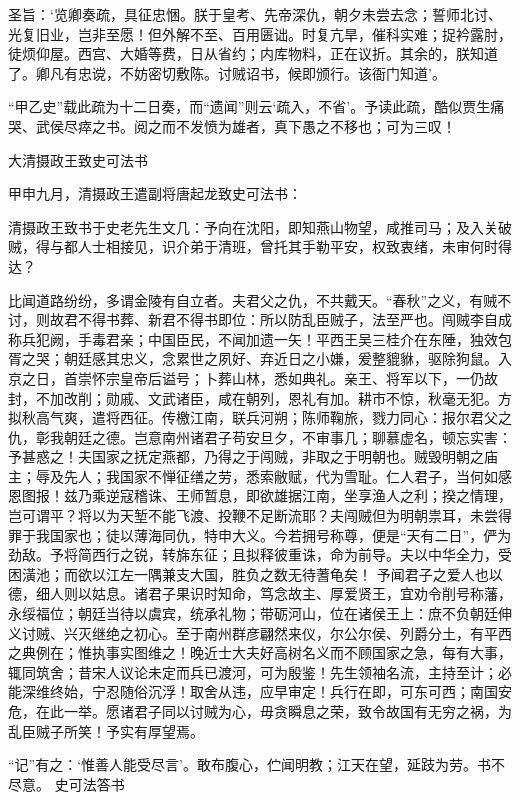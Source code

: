 \documentclass[]{article}
\begin{document}
圣旨：`览卿奏疏，具征忠悃。朕于皇考、先帝深仇，朝夕未尝去念；誓师北讨、光复旧业，岂非至愿！但外解不至、百用匮诎。时复亢旱，催科实难；捉衿露肘，徒烦仰屋。西宫、大婚等费，日从省约；内库物料，正在议折。其余的，朕知道了。卿凡有忠谠，不妨密切敷陈。讨贼诏书，候即颁行。该衙门知道'。

``甲乙史''载此疏为十二日奏，而``遗闻''则云`疏入，不省'。予读此疏，酷似贾生痛哭、武侯尽瘁之书。阅之而不发愤为雄者，真下愚之不移也；可为三叹！

大清摄政王致史可法书

甲申九月，清摄政王遣副将唐起龙致史可法书：

清摄政王致书于史老先生文几：予向在沈阳，即知燕山物望，咸推司马；及入关破贼，得与都人士相接见，识介弟于清班，曾托其手勒平安，权致衷绪，未审何时得达？

比闻道路纷纷，多谓金陵有自立者。夫君父之仇，不共戴天。``春秋''之义，有贼不讨，则故君不得书葬、新君不得书即位：所以防乱臣贼子，法至严也。闯贼李自成称兵犯阙，手毒君亲；中国臣民，不闻加遗一矢！平西王吴三桂介在东陲，独效包胥之哭；朝廷感其忠义，念累世之夙好、弃近日之小嫌，爰整貔貅，驱除狗鼠。入京之日，首崇怀宗皇帝后谥号；卜葬山林，悉如典礼。亲王、将军以下，一仍故封，不加改削；勋戚、文武诸臣，咸在朝列，恩礼有加。耕市不惊，秋毫无犯。方拟秋高气爽，遣将西征。传檄江南，联兵河朔；陈师鞠旅，戮力同心：报尔君父之仇，彰我朝廷之德。岂意南州诸君子苟安旦夕，不审事几；聊慕虚名，顿忘实害：予甚惑之！夫国家之抚定燕都，乃得之于闯贼，非取之于明朝也。贼毁明朝之庙主；辱及先人；我国家不惮征缮之劳，悉索敝赋，代为雪耻。仁人君子，当何如感恩图报！兹乃乘逆寇稽诛、王师暂息，即欲雄据江南，坐享渔人之利；揆之情理，岂可谓平？将以为天堑不能飞渡、投鞭不足断流耶？夫闯贼但为明朝祟耳，未尝得罪于我国家也；徒以薄海同仇，特申大义。今若拥号称尊，便是``天有二日''，俨为劲敌。予将简西行之锐，转旆东征；且拟释彼重诛，命为前导。夫以中华全力，受困潢池；而欲以江左一隅兼支大国，胜负之数无待蓍龟矣！
予闻君子之爱人也以德，细人则以姑息。诸君子果识时知命，笃念故主、厚爱贤王，宜劝令削号称藩，永绥福位；朝廷当待以虞宾，统承礼物；带砺河山，位在诸侯王上：庶不负朝廷伸义讨贼、兴灭继绝之初心。至于南州群彦翩然来仪，尔公尔侯、列爵分土，有平西之典例在；惟执事实图维之！晚近士大夫好高树名义而不顾国家之急，每有大事，辄同筑舍；昔宋人议论未定而兵已渡河，可为殷鉴！先生领袖名流，主持至计；必能深维终始，宁忍随俗沉浮！取舍从违，应早审定！兵行在即，可东可西；南国安危，在此一举。愿诸君子同以讨贼为心，毋贪瞬息之荣，致令故国有无穷之祸，为乱臣贼子所笑！予实有厚望焉。

``记''有之：`惟善人能受尽言'。敢布腹心，伫闻明教；江天在望，延跂为劳。书不尽意。
史可法答书
\end{document}
